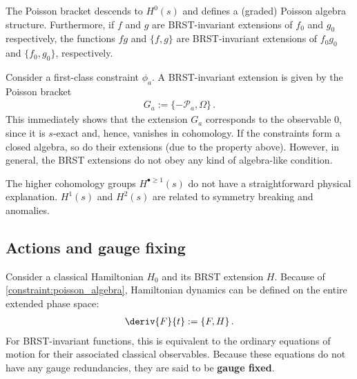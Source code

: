     \begin{property}\label{constraint:poisson_algebra}
        The Poisson bracket descends to $H^0(s)$ and defines a (graded) Poisson algebra structure. Furthermore, if $f$ and $g$ are BRST-invariant extensions of $f_0$ and $g_0$ respectively, the functions $fg$ and $\{f,g\}$ are BRST-invariant extensions of $f_0g_0$ and $\{f_0,g_0\}$, respectively.
    \end{property}

    \begin{example}
        Consider a first-class constraint $\phi_a$. A BRST-invariant extension is given by the Poisson bracket
        \begin{gather}
            G_a := \{-\mathcal{P}_a,\Omega\}\,.
        \end{gather}
        This immediately shows that the extension $G_a$ corresponds to the observable 0, since it is $s$-exact and, hence, vanishes in cohomology. If the constraints form a closed algebra, so do their extensions (due to the property above). However, in general, the BRST extensions do not obey any kind of algebra-like condition.
    \end{example}

    \begin{remark}
        The higher cohomology groups $H^{\bullet\geq1}(s)$ do not have a straightforward physical explanation. $H^1(s)$ and $H^2(s)$ are related to symmetry breaking and anomalies.
    \end{remark}

\subsection{Actions and gauge fixing}

    Consider a classical Hamiltonian $H_0$ and its BRST extension $H$. Because of \cref{constraint:poisson_algebra}, Hamiltonian dynamics can be defined on the entire extended phase space:
    \begin{gather}
        \deriv{F}{t} := \{F,H\}\,.
    \end{gather}
    For BRST-invariant functions, this is equivalent to the ordinary equations of motion for their associated classical observables. Because these equations do not have any gauge redundancies, they are said to be \textbf{gauge fixed}.


